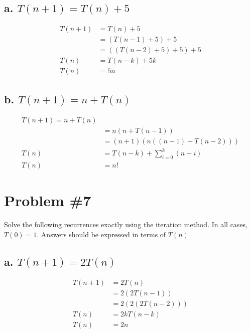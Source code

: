 \documentclass{article}
\begin{document}
\subsection*{a. \(T(n + 1) = T(n) + 5\)}
\begin{subequations}
\begin{align}
T(n + 1) &= T(n) + 5 \\
&= (T(n - 1) + 5) + 5 \\
&= ((T(n - 2) + 5) + 5) + 5 \\
T(n) &= T(n - k) + 5k \\
T(n) &= 5n
\end{align}
\end{subequations}

\subsection*{b. \(T(n + 1) = n + T(n)\)}
\begin{subequations}
  \begin{align}
    T(n + 1) = n + T(n) \\
    &= n(n + T(n - 1)) \\
    &= (n + 1)(n((n - 1) + T(n - 2))) \\
    T(n) &= T(n - k) + \sum_{i=0}^{k}(n - i)\\
    T(n) &= n!
  \end{align}
\end{subequations}

\section*{Problem \#7}
Solve the following recurrences exactly using the iteration method. In all cases, \(T(0) = 1\).
Answers should be expressed in terms of \(T(n)\)

\subsection*{a. \(T(n + 1) = 2T(n)\)}
\begin{subequations}
  \begin{align}
    T(n + 1) &= 2T(n) \\
    &= 2(2T(n - 1)) \\
    &= 2(2(2T(n - 2))) \\
    T(n) &= 2kT(n - k) \\
    T(n) &= 2n
  \end{align}
\end{subequations}
\end{document}
